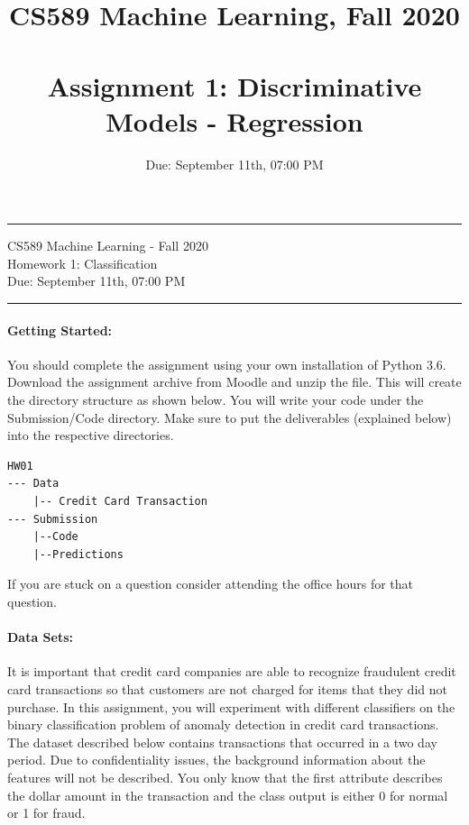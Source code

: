 \documentclass[letterpaper]{article}
\title{CS589 Machine Learning, Fall 2020 \\ \ \\ \large{Assignment 1: Discriminative Models - Regression}}
\date{Due: September 11th, 07:00 PM}
\begin{document}
{\centering
  \rule{6.3in}{2pt}
  \vspace{1em}
  {\Large
    CS589 Machine Learning - Fall 2020 \\
    Homework 1: Classification \\
  }
  \vspace{1em}
  Due: September 11th, 07:00 PM \\
  \vspace{0.1em}
  \rule{6.3in}{1.5pt}
}
\vspace{1pc}


\paragraph*{Getting Started:} You should complete the assignment using your own installation of Python 3.6. Download the assignment archive from Moodle and unzip the file. This will create the directory structure as shown below. You will write your code under the Submission/Code directory. Make sure to put the deliverables (explained below) into the respective directories.

\begin{verbatim}
HW01
--- Data
    |-- Credit Card Transaction
--- Submission
    |--Code
    |--Predictions
\end{verbatim}

If you are stuck on a question consider attending the office hours for that question.

\paragraph*{Data Sets:} It is important that credit card companies are able to recognize fraudulent credit card transactions so that customers are not charged for items that they did not purchase. In this assignment, you will experiment with different classifiers on the binary classification problem of anomaly detection in credit card transactions. The dataset described below contains transactions that occurred in a two day period. Due to confidentiality issues, the background information about the features will not be described. You only know that the first attribute describes the dollar amount in the transaction and the class output is either 0 for normal or 1 for fraud. \vspace{12pt}
\end{document}
